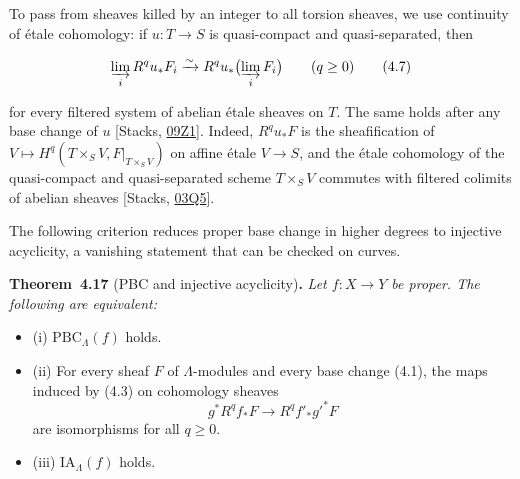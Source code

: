 \documentclass[11pt]{article}
\newenvironment{bpstatement}[2]{\par\addvspace{0.6\baselineskip}\noindent\textbf{#1}#2\textbf{.}\enspace\ignorespaces}
  {\par\addvspace{0.4\baselineskip}}
\newenvironment{bpstatementit}[2]{\begin{bpstatement}{#1}{#2}\itshape\ignorespaces}{\end{bpstatement}}
\begin{document}
\label{bp328}%
To pass from sheaves killed by an integer to all torsion sheaves, we use continuity of étale cohomology: if \(u:T\to S\) is quasi-compact and quasi-separated, then

\[
\varinjlim_i R^qu_*F_i\xrightarrow{\sim}
R^qu_*\bigl(\varinjlim_i F_i\bigr)\qquad(q\geq0)
\tag{4.7}
\]

for every filtered system of abelian étale sheaves on \(T\). The same holds after any base change of \(u\) [Stacks, \href{https://stacks.math.columbia.edu/tag/09Z1}{09Z1}]. Indeed, \(R^qu_*F\) is the sheafification of \(V\mapsto H^q(T\times_SV,F|_{T\times_SV})\) on affine étale \(V\to S\), and the étale cohomology of the quasi-compact and quasi-separated scheme \(T\times_SV\) commutes with filtered colimits of abelian sheaves [Stacks, \href{https://stacks.math.columbia.edu/tag/03Q5}{03Q5}].

The following criterion reduces proper base change in higher degrees to injective acyclicity, a vanishing statement that can be checked on curves.

\label{bp329}%
\begin{bpstatementit}{Theorem~4.17}{ (PBC and injective acyclicity)}
Let \(f:X\to Y\) be proper. The following are equivalent:

\begin{itemize}
\item (i) \(\mathrm{PBC}_\Lambda(f)\) holds.
\item (ii) For every sheaf \(F\) of \(\Lambda\)-modules and every base change (4.1), the maps induced by (4.3) on cohomology sheaves \[
  g^*R^qf_*F\longrightarrow R^qf'_*g'^*F
  \] are isomorphisms for all \(q\geq0\).
\item (iii) \(\mathrm{IA}_\Lambda(f)\) holds.
\end{itemize}
\end{bpstatementit}
\end{document}
